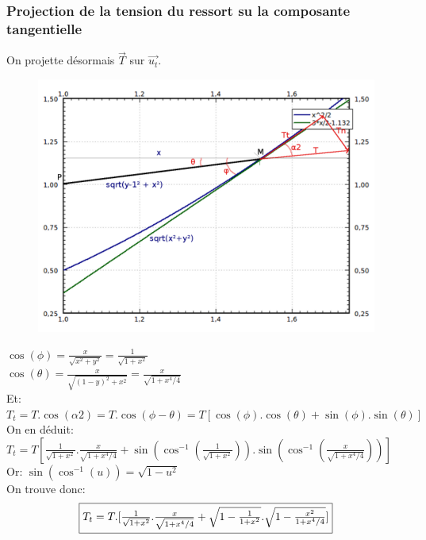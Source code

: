 \documentclass[10pt,a4paper]{article}
\begin{document}
\subsubsection{Projection de la tension du ressort su la composante tangentielle}
On projette désormais $\vec{T}$ sur $\vec{u_t}$.\\
\begin{figure}[H]
	\includegraphics[scale=0.35]{GraphMathZoomProjectionT2.png}
\end{figure} 

$\cos(\phi)=\frac{x}{\sqrt{x^2+y^2}}=\frac{1}{\sqrt{1+x^2}}$ \\

$\cos(\theta)=\frac{x}{\sqrt{(1-y)^2+x^2}}=\frac{x}{\sqrt{1+x^4/4}}$ \\
Et: 
$T_t=T.\cos(\alpha 2)=T.\cos(\phi - \theta)=T[\cos(\phi).\cos(\theta)+\sin(\phi).\sin(\theta)]$\\
On en déduit:\\
$T_t=T[\frac{1}{\sqrt{1+x^2}}.\frac{x}{\sqrt{1+x^4/4}} + \sin(\cos^{-1}(\frac{1}{\sqrt{1+x^2}})).\sin(\cos^{-1}(\frac{x}{\sqrt{1+x^4/4}}))]$\\
Or: $\sin(\cos^{-1}(u))=\sqrt{1-u^2}$\\
On trouve donc:\[\fbox{$T_t=T.[\frac{1}{\sqrt{1+x^2}}.\frac{x}{\sqrt{1+x^4/4}} + \sqrt{1-\frac{1}{1+x^2}}.\sqrt{1-\frac{x^2}{1+x^4/4}}]$}\]\\

\end{document}

